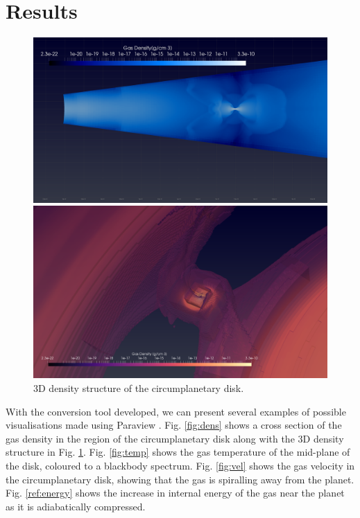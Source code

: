 \documentclass[twocolumn]{aastex62}
\begin{document}
\section{Results}\label{sec:res}
\begin{figure}
	\centering
	\includegraphics[width=0.95\linewidth]{figures/Dens5YCut0Zoom.png}
	\caption{\label{fig:dens} Cross section of gas density of the circumplanetary disk of a planet embedded at 50 AU in the circumstellar disk of a 1 solar mass star.}
	\includegraphics[width=0.9\linewidth]{figures/DensityStructure3D.png}
	\caption{\label{fig:d3d} 3D density structure of the circumplanetary disk.}
\end{figure}
With the conversion tool developed, we can present several examples of possible visualisations made using Paraview \cite{para}. Fig. \ref{fig:dens} shows a cross section of the gas density in the region of the circumplanetary disk along with the 3D density structure in Fig. \ref{fig:d3d}. Fig. \ref{fig:temp} shows the gas temperature of the mid-plane of the disk, coloured to a blackbody spectrum. Fig. \ref{fig:vel} shows the gas velocity in the circumplanetary disk, showing that the gas is spiralling away from the planet. Fig. \ref{ref:energy} shows the increase in internal energy of the gas near the planet as it is adiabatically compressed.
\end{document}
